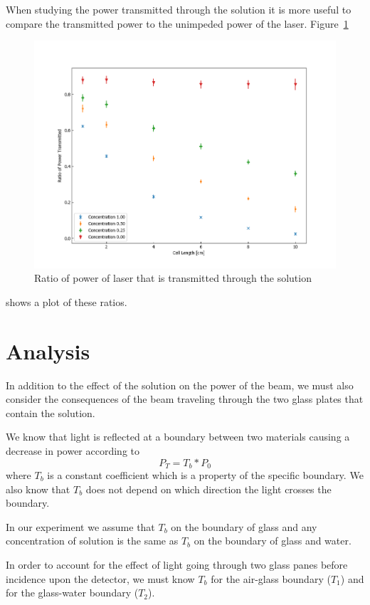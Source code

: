 \documentclass[aps,prl,reprint,groupedaddress,amsmath,amssymb,aps]{revtex4-1}
\begin{document}
	When studying the power transmitted through the solution it is more useful to compare the transmitted power to the unimpeded power of the laser. Figure~\ref{transRatio}
	\begin{figure}
		\includegraphics[width=\columnwidth]{transRatio.png}
		\caption{\label{transRatio}Ratio of power of laser that is transmitted through the solution}
	\end{figure}
	shows a plot of these ratios.
	
	\section{\label{sec:level1}Analysis}
	In addition to the effect of the solution on the power of the beam, we must also consider the consequences of the beam traveling through the two glass plates that contain the solution.
	
	We know that light is reflected at a boundary between two materials causing a decrease in power according to
	\begin{equation}
		P_T = T_b*P_0
	\end{equation}
	where $T_b$ is a constant coefficient which is a property of the specific boundary. We also know that $T_b$ does not depend on which direction the light crosses the boundary.
	
	In our experiment we assume that $T_b$ on the boundary of glass and any concentration of solution is the same as $T_b$ on the boundary of glass and water.
	
	In order to account for the effect of light going through two glass panes before incidence upon the detector, we must know $T_b$ for the air-glass boundary ($T_1$) and for the glass-water boundary ($T_2$).
	
\end{document}
